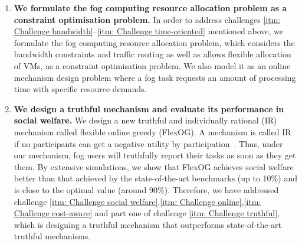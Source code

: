 \documentclass[11pt]{phdthesis}
\begin{document}
\begin{enumerate}
	\item \textbf{We formulate the fog computing resource allocation problem as a constraint optimisation problem.} In order to address challenges \ref{itm: Challenge bandwidth}--\ref{itm: Challenge time-oriented} mentioned above, we formulate the fog computing resource allocation problem, which considers the bandwidth constraints and traffic routing as well as allows flexible allocation of VMs, as a constraint optimisation problem. We also model it as an online mechanism design problem where a fog task requests an amount of processing time with specific resource demands.
	
	
	\item \textbf{We design a truthful mechanism and evaluate its performance in social welfare.} We design a new truthful and individually rational (IR) mechanism called flexible online greedy (FlexOG). A mechanism is called IR if no participants can get a negative utility by participation~\citep{nisan2007algorithmic}. Thus, under our mechanism, fog users will truthfully report their tasks as soon as they get them. By extensive simulations, we show that FlexOG achieves social welfare better than that achieved by the state-of-the-art benchmarks (up to 10\%) and is close to the optimal value (around 90\%). Therefore, we have addressed challenge \ref{itm: Challenge social welfare},\ref{itm: Challenge online},\ref{itm: Challenge cost-aware} and part one of challenge \ref{itm: Challenge truthful}, which is designing a truthful mechanism that outperforms state-of-the-art truthful mechanisms.
	

\end{enumerate}
\end{document}
